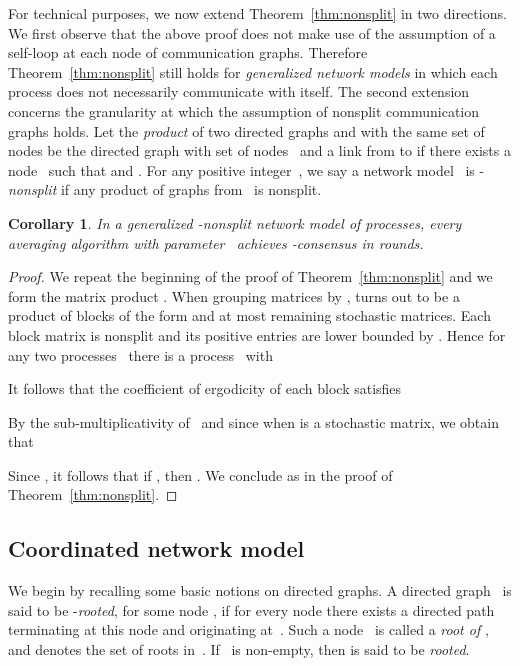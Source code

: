 \documentclass[a4paper]{article}
\theoremstyle{newthm}
\newtheorem{cor}[thm]{Corollary}
\begin{document}
For technical purposes, we now extend Theorem~\ref{thm:nonsplit} in two directions.
We first observe that the 
	above proof does not make use of the assumption of a self-loop at each node of
	communication graphs.
Therefore Theorem~\ref{thm:nonsplit}  still holds for {\em generalized network models\/} 
	in which each process does not necessarily communicate with itself.
The second extension concerns the granularity at which the assumption of nonsplit 
	communication graphs holds.
Let the {\em product\/} of two directed graphs  and  with the same set of nodes 
	be the directed graph   with set of nodes~ and a  link from  to  
	 if there exists a node~ such that  and .
For any positive integer~, we say a network model~ is -{\em nonsplit\/} if any product of 
	graphs from~ is nonsplit. 

\begin{cor}\label{cor:nonsplit}
In a generalized -nonsplit network model of  processes, every averaging algorithm with parameter~
	achieves -consensus in 
	 rounds.
\end{cor}

\begin{proof}
We repeat the beginning of the proof of Theorem~\ref{thm:nonsplit}
	and we form the matrix product .
When grouping matrices  by ,   turns out to be  a product
	of  blocks of the form 
     and at most  remaining stochastic matrices.
Each block matrix is nonsplit and 
	its positive entries are lower bounded by .
Hence for any two processes~ there is a process~ with  
	
It follows that the coefficient of ergodicity  of each block  satisfies
	
By the sub-multiplicativity of~ and since   when 
	 is a stochastic matrix, 
     we obtain that 
	
Since , it follows  that 
     if ,
     then .
We conclude as in the proof of Theorem~\ref{thm:nonsplit}.
\end{proof}

\subsection{Coordinated network model}\label{sec:coordinated}

We begin by recalling some basic notions on directed graphs.
A directed graph~ is said to be -{\em rooted}, for some node ,
 	if for every node there exists a directed path  terminating at this node and originating at~. 
Such a node~ is called a {\em root of} , and  denotes the  set of roots in~.
If~ is non-empty, then  is said to be {\em rooted}.
\end{document}
